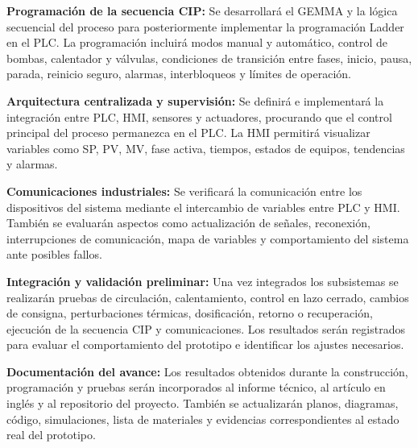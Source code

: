 \par\medskip
\noindent\textbf{Programación de la secuencia CIP:} Se desarrollará el GEMMA y la lógica secuencial del proceso para posteriormente implementar la programación Ladder en el PLC. La programación incluirá modos manual y automático, control de bombas, calentador y válvulas, condiciones de transición entre fases, inicio, pausa, parada, reinicio seguro, alarmas, interbloqueos y límites de operación.
\par\medskip
\noindent\textbf{Arquitectura centralizada y supervisión:} Se definirá e implementará la integración entre PLC, HMI, sensores y actuadores, procurando que el control principal del proceso permanezca en el PLC. La HMI permitirá visualizar variables como SP, PV, MV, fase activa, tiempos, estados de equipos, tendencias y alarmas.
\par\medskip
\noindent\textbf{Comunicaciones industriales:} Se verificará la comunicación entre los dispositivos del sistema mediante el intercambio de variables entre PLC y HMI. También se evaluarán aspectos como actualización de señales, reconexión, interrupciones de comunicación, mapa de variables y comportamiento del sistema ante posibles fallos.
\par\medskip
\noindent\textbf{Integración y validación preliminar:} Una vez integrados los subsistemas se realizarán pruebas de circulación, calentamiento, control en lazo cerrado, cambios de consigna, perturbaciones térmicas, dosificación, retorno o recuperación, ejecución de la secuencia CIP y comunicaciones. Los resultados serán registrados para evaluar el comportamiento del prototipo e identificar los ajustes necesarios.
\par\medskip
\noindent\textbf{Documentación del avance:} Los resultados obtenidos durante la construcción, programación y pruebas serán incorporados al informe técnico, al artículo en inglés y al repositorio del proyecto. También se actualizarán planos, diagramas, código, simulaciones, lista de materiales y evidencias correspondientes al estado real del prototipo.